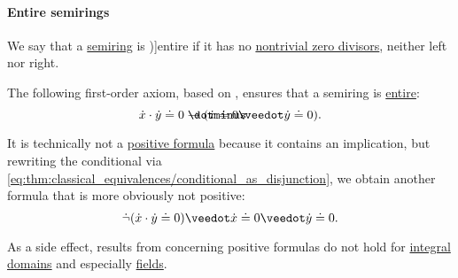 \paragraph{Entire semirings}

\begin{definition}\label{def:entire_semiring}
  We say that a \hyperref[def:semiring]{semiring} is \term[ru=целостное (\cite[def. 3.5.1]{Винберг2014Алгебра})]{entire} if it has no \hyperref[def:divisibility]{nontrivial zero divisors}, neither left nor right.
\end{definition}

\begin{remark}\label{rem:entire_semiring_axiom}
  The following first-order axiom, based on \cite[def. III.1.10]{Aluffi2009Algebra}, ensures that a semiring is \hyperref[def:entire_semiring]{entire}:
  \begin{equation}\label{eq:rem:entire_semiring_axiom}
    \synx \cdot \syny \syneq 0 \synimplies (\synx \syneq 0 \synvee \syny \syneq 0).
  \end{equation}

  It is technically not a \hyperref[def:positive_formula]{positive formula} because it contains an implication, but rewriting the conditional via \eqref{eq:thm:classical_equivalences/conditional_as_disjunction}, we obtain another formula that is more obviously not positive:
  \begin{equation*}
    \synneg (\synx \cdot \syny \syneq 0) \synvee \synx \syneq 0 \synvee \syny \syneq 0.
  \end{equation*}

  As a side effect, results from  concerning positive formulas do not hold for \hyperref[def:integral_domain]{integral domains} and especially \hyperref[def:field]{fields}.
\end{remark}

